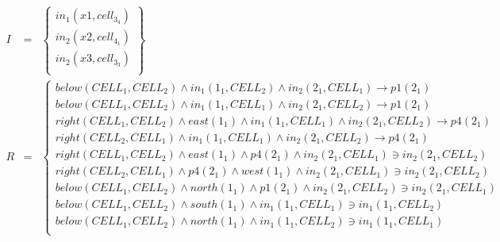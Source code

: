 \begin{eqnarray*}
I & = & \left\{ \begin{array}{l}
\mathit{in}_1(\mathit{x}1,\mathit{cell}_3_4)\\
\mathit{in}_2(\mathit{x}2,\mathit{cell}_4_1)\\
\mathit{in}_2(\mathit{x}3,\mathit{cell}_3_3)\\
\end{array}\right\}\\
R & = &  \left\{ \begin{array}{l}
\mathit{below}(\mathit{CELL}_1,\mathit{CELL}_2) \wedge \mathit{in}_1(\mathit{}1_1,\mathit{CELL}_2) \wedge \mathit{in}_2(\mathit{}2_1,\mathit{CELL}_1) \rightarrow \mathit{p}1(\mathit{}2_1)\\
\mathit{below}(\mathit{CELL}_1,\mathit{CELL}_2) \wedge \mathit{in}_1(\mathit{}1_1,\mathit{CELL}_1) \wedge \mathit{in}_2(\mathit{}2_1,\mathit{CELL}_2) \rightarrow \mathit{p}1(\mathit{}2_1)\\
\mathit{right}(\mathit{CELL}_1,\mathit{CELL}_2) \wedge \mathit{east}(\mathit{}1_1) \wedge \mathit{in}_1(\mathit{}1_1,\mathit{CELL}_1) \wedge \mathit{in}_2(\mathit{}2_1,\mathit{CELL}_2) \rightarrow \mathit{p}4(\mathit{}2_1)\\
\mathit{right}(\mathit{CELL}_2,\mathit{CELL}_1) \wedge \mathit{in}_1(\mathit{}1_1,\mathit{CELL}_1) \wedge \mathit{in}_2(\mathit{}2_1,\mathit{CELL}_2) \rightarrow \mathit{p}4(\mathit{}2_1)\\
\mathit{right}(\mathit{CELL}_1,\mathit{CELL}_2) \wedge \mathit{east}(\mathit{}1_1) \wedge \mathit{p}4(\mathit{}2_1) \wedge \mathit{in}_2(\mathit{}2_1,\mathit{CELL}_1) \ni \mathit{in}_2(\mathit{}2_1,\mathit{CELL}_2)\\
\mathit{right}(\mathit{CELL}_2,\mathit{CELL}_1) \wedge \mathit{p}4(\mathit{}2_1) \wedge \mathit{west}(\mathit{}1_1) \wedge \mathit{in}_2(\mathit{}2_1,\mathit{CELL}_1) \ni \mathit{in}_2(\mathit{}2_1,\mathit{CELL}_2)\\
\mathit{below}(\mathit{CELL}_1,\mathit{CELL}_2) \wedge \mathit{north}(\mathit{}1_1) \wedge \mathit{p}1(\mathit{}2_1) \wedge \mathit{in}_2(\mathit{}2_1,\mathit{CELL}_2) \ni \mathit{in}_2(\mathit{}2_1,\mathit{CELL}_1)\\
\mathit{below}(\mathit{CELL}_1,\mathit{CELL}_2) \wedge \mathit{south}(\mathit{}1_1) \wedge \mathit{in}_1(\mathit{}1_1,\mathit{CELL}_1) \ni \mathit{in}_1(\mathit{}1_1,\mathit{CELL}_2)\\
\mathit{below}(\mathit{CELL}_1,\mathit{CELL}_2) \wedge \mathit{north}(\mathit{}1_1) \wedge \mathit{in}_1(\mathit{}1_1,\mathit{CELL}_2) \ni \mathit{in}_1(\mathit{}1_1,\mathit{CELL}_1)\\

\end{array}
\end{eqnarray*}
